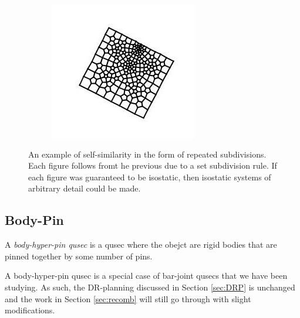 \begin{figure}
\begin{subfigure}{0.25\linewidth}
    \end{subfigure}
    \begin{subfigure}{0.4\linewidth}
        \includegraphics[width=\linewidth]{img/pentl3}
    \end{subfigure}
    \caption{An example of self-similarity in the form of repeated subdivisions. Each figure follows fromt he previous due to a set subdivision rule. If each figure was guaranteed to be isostatic, then isostatic systems of arbitrary detail could be made.}
    \label{fig:subdivision}
\end{figure}

\subsection{Body-Pin}


\begin{definition}
    A \emph{body-hyper-pin qusec} is a qusec where the obejct are rigid bodies that are pinned together by some number of pins.
\end{definition}

\begin{remark}
    A body-hyper-pin qusec is a special case of bar-joint qusecs that we have been studying. As such, the DR-planning discussed in Section \ref{sec:DRP} is unchanged and the work in Section \ref{sec:recomb} will still go through with slight modifications.
\end{remark}


